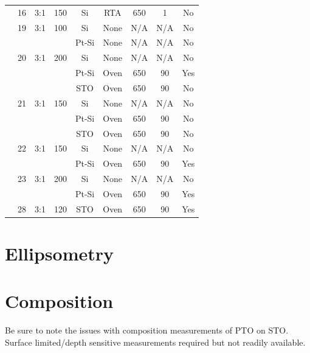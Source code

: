 {\begin{longtable}{ccccccccc}
		&16		&3:1		&150	&Si		&RTA	&650	&1		&No\\
		&19		&3:1		&100	&Si		&None 	&N/A		&N/A		&No\\
		&		&		&		&Pt-Si	&None 	&N/A		&N/A		&No\\
		&20		&3:1		&200	&Si		&None 	&N/A		&N/A		&No\\
		&		&		&		&Pt-Si	&Oven	&650	&90		&Yes\\
		&		&		&		&STO	&Oven	&650	&90		&No\\
		&21		&3:1		&150	&Si		&None 	&N/A		&N/A		&No\\
		&		&		&		&Pt-Si	&Oven	&650	&90		&No\\
		&		&		&		&STO	&Oven	&650	&90		&No\\
		&22		&3:1		&150	&Si		&None 	&N/A		&N/A		&No\\
		&		&		&		&Pt-Si	&Oven	&650	&90		&Yes\\
		&23		&3:1		&200	&Si		&None 	&N/A		&N/A		&No\\
		&		&		&		&Pt-Si	&Oven	&650	&90		&Yes\\
		&28		&3:1		&120	&STO	&Oven	&650	&90		&Yes\\
	\bottomrule
\end{longtable}}


\section{Ellipsometry}
\label{chap:Results-Ellipsometry}




\section{Composition}
\label{chap:Results-Composition}



Be sure to note the issues with composition measurements of PTO on STO. Surface limited/depth sensitive measurements required but not readily available. 

